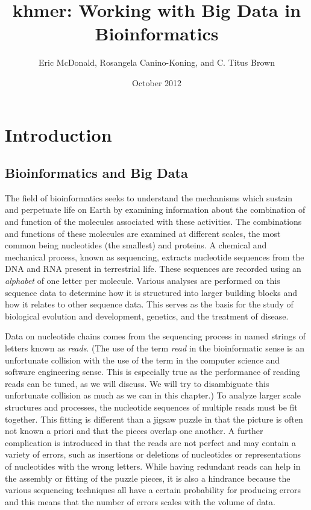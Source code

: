 \documentclass{article}
\title{khmer: Working with Big Data in Bioinformatics}
\author{Eric McDonald, Rosangela Canino-Koning, and C. Titus Brown}
\date{October 2012}
\begin{document}
\maketitle

\section{Introduction}

\subsection{Bioinformatics and Big Data}

The field of bioinformatics seeks to understand the mechanisms which sustain and perpetuate life on Earth by examining information about the combination of and function of the molecules associated with these activities. The combinations and functions of these molecules are examined at different scales, the most common being nucleotides (the smallest) and proteins. A chemical and mechanical process, known as sequencing, extracts nucleotide sequences from the DNA and RNA present in terrestrial life. These sequences are recorded using an \textit{alphabet} of one letter per molecule. Various analyses are performed on this sequence data to determine how it is structured into larger building blocks and how it relates to other sequence data. This serves as the basis for the study of biological evolution and development, genetics, and the treatment of disease.

Data on nucleotide chains comes from the sequencing process in named strings of letters known as \textit{reads}. (The use of the term \textit{read} in the bioinformatic sense is an unfortunate collision with the use of the term in the computer science and software engineering sense. This is especially true as the performance of reading reads can be tuned, as we will discuss. We will try to disambiguate this unfortunate collision as much as we can in this chapter.) To analyze larger scale structures and processes, the nucleotide sequences of multiple reads must be fit together. This fitting is different than a jigsaw puzzle in that the picture is often not known a priori and that the pieces overlap one another. A further complication is introduced in that the reads are not perfect and may contain a variety of errors, such as insertions or deletions of nucleotides or representations of nucleotides with the wrong letters. While having redundant reads can help in the assembly or fitting of the puzzle pieces, it is also a hindrance because the various sequencing techniques all have a certain probability for producing errors and this means that the number of errors scales with the volume of data.
\end{document}
